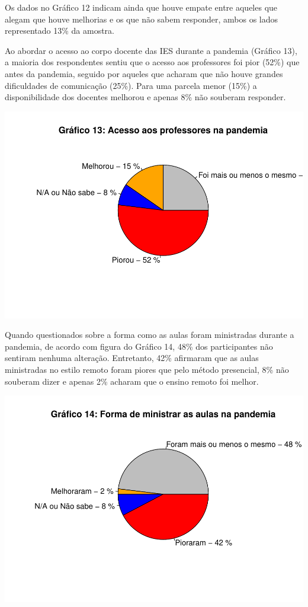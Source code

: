 \documentclass[
]{article}
\begin{document}
Os dados no Gráfico 12 indicam ainda que houve empate entre aqueles que
alegam que houve melhorias e os que não sabem responder, ambos os lados
representado 13\% da amostra.

Ao abordar o acesso ao corpo docente das IES durante a pandemia (Gráfico
13), a maioria dos respondentes sentiu que o acesso aos professores foi
pior (52\%) que antes da pandemia, seguido por aqueles que acharam que
não houve grandes dificuldades de comunicação (25\%). Para uma parcela
menor (15\%) a disponibilidade dos docentes melhorou e apenas 8\% não
souberam responder.

\includegraphics{consequencias-oriundas-da-pandemia-v1.0_files/figure-latex/grafico-13-1.pdf}

Quando questionados sobre a forma como as aulas foram ministradas
durante a pandemia, de acordo com figura do Gráfico 14, 48\% dos
participantes não sentiram nenhuma alteração. Entretanto, 42\% afirmaram
que as aulas ministradas no estilo remoto foram piores que pelo método
presencial, 8\% não souberam dizer e apenas 2\% acharam que o ensino
remoto foi melhor.

\includegraphics{consequencias-oriundas-da-pandemia-v1.0_files/figure-latex/grafico-14-1.pdf}
\end{document}
